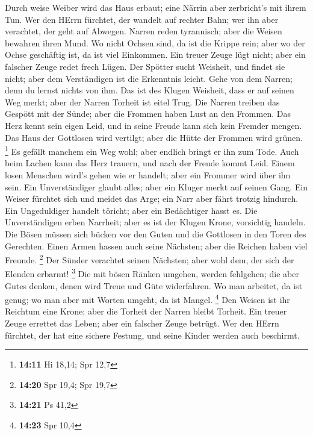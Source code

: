  Durch weise Weiber wird das Haus erbaut; eine Närrin aber
zerbricht's mit ihrem Tun.  Wer den HErrn fürchtet, der
wandelt auf rechter Bahn; wer ihn aber verachtet, der geht auf Abwegen.
 Narren reden tyrannisch; aber die Weisen bewahren ihren
Mund.  Wo nicht Ochsen sind, da ist die Krippe rein; aber wo
der Ochse geschäftig ist, da ist viel Einkommen.  Ein treuer
Zeuge lügt nicht; aber ein falscher Zeuge redet frech Lügen.
 Der Spötter sucht Weisheit, und findet sie nicht; aber dem
Verständigen ist die Erkenntnis leicht.  Gehe von dem
Narren; denn du lernst nichts von ihm.  Das ist des Klugen
Weisheit, dass er auf seinen Weg merkt; aber der Narren Torheit ist
eitel Trug.  Die Narren treiben das Gespött mit der Sünde;
aber die Frommen haben Lust an den Frommen.  Das Herz kennt
sein eigen Leid, und in seine Freude kann sich kein Fremder mengen.
 Das Haus der Gottlosen wird vertilgt; aber die Hütte der
Frommen wird grünen. \footnote{\textbf{14:11} Hi 18,14; Spr 12,7}
 Es gefällt manchem ein Weg wohl; aber endlich bringt er
ihn zum Tode.  Auch beim Lachen kann das Herz trauern, und
nach der Freude kommt Leid.  Einem losen Menschen wird's
gehen wie er handelt; aber ein Frommer wird über ihn sein. 
Ein Unverständiger glaubt alles; aber ein Kluger merkt auf seinen Gang.
 Ein Weiser fürchtet sich und meidet das Arge; ein Narr
aber fährt trotzig hindurch.  Ein Ungeduldiger handelt
töricht; aber ein Bedächtiger hasst es.  Die Unverständigen
erben Narrheit; aber es ist der Klugen Krone, vorsichtig handeln.
 Die Bösen müssen sich bücken vor den Guten und die
Gottlosen in den Toren des Gerechten.  Einen Armen hassen
auch seine Nächsten; aber die Reichen haben viel Freunde. \footnote{\textbf{14:20}
  Spr 19,4; Spr 19,7}  Der Sünder verachtet seinen
Nächsten; aber wohl dem, der sich der Elenden erbarmt! \footnote{\textbf{14:21}
  Ps 41,2}  Die mit bösen Ränken umgehen, werden fehlgehen;
die aber Gutes denken, denen wird Treue und Güte widerfahren.
 Wo man arbeitet, da ist genug; wo man aber mit Worten
umgeht, da ist Mangel. \footnote{\textbf{14:23} Spr 10,4} 
Den Weisen ist ihr Reichtum eine Krone; aber die Torheit der Narren
bleibt Torheit.  Ein treuer Zeuge errettet das Leben; aber
ein falscher Zeuge betrügt.  Wer den HErrn fürchtet, der
hat eine sichere Festung, und seine Kinder werden auch beschirmt.

